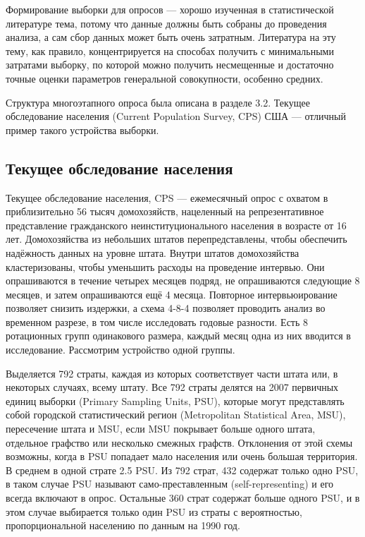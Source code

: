 Формирование выборки для опросов --- хорошо изученная в статистической литературе тема, потому что данные должны быть собраны до проведения анализа, а сам сбор данных может быть очень затратным. Литература на эту тему, как правило, концентрируется на способах получить с минимальными затратами выборку, по которой можно получить несмещенные и достаточно точные оценки параметров генеральной совокупности, особенно средних. 

Структура многоэтапного опроса была описана в разделе 3.2. Текущее обследование населения (Current Population Survey, CPS) США --- отличный пример такого устройства выборки. 

\subsection{Текущее обследование населения}

Текущее обследование населения, CPS --- ежемесячный опрос с охватом в приблизительно 56 тысяч домохозяйств, нацеленный на репрезентативное представление гражданского неинституционального населения в возрасте от 16 лет. Домохозяйства из небольших штатов перепредставлены, чтобы обеспечить надёжность данных на уровне штата. Внутри штатов домохозяйства кластеризованы, чтобы уменьшить расходы на проведение интервью. Они опрашиваются в течение четырех месяцев подряд, не опрашиваются следующие 8 месяцев, и затем опрашиваются ещё 4 месяца. Повторное интервьюирование позволяет снизить издержки, а схема 4-8-4 позволяет проводить анализ во временном разрезе, в том числе исследовать годовые разности. Есть 8 ротационных групп одинакового размера, каждый месяц одна из них вводится в исследование. Рассмотрим устройство одной группы. 

Выделяется 792 страты, каждая из которых соответствует части штата или, в некоторых случаях, всему штату. Все 792 страты делятся на 2007 первичных единиц выборки (Primary Sampling Units, PSU), которые могут представлять собой городской статистический регион (Metropolitan Statistical Area, MSU), пересечение штата и MSU, если MSU покрывает больше одного штата, отдельное графство или несколько смежных графств. Отклонения от этой схемы возможны, когда в PSU попадает мало населения или очень большая территория. В среднем в одной страте 2.5 PSU. Из 792 страт, 432 содержат только одно PSU, в таком случае PSU называют само-преставленным (self-representing) и его всегда включают в опрос. Остальные 360 страт содержат больше одного PSU, и в этом случае выбирается только один PSU из страты с вероятностью, пропорциональной населению по данным на 1990 год. 

